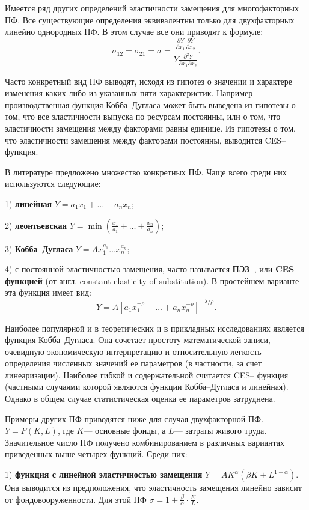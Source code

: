 \documentclass[12pt,openbib]{report}
\begin{document}
Имеется ряд других определений эластичности замещения для
многофакторных ПФ. Все существующие определения эквивалентны только
для двухфакторных линейно однородных ПФ. В этом случае все они
приводят к формуле:
$$\sigma_{12}=\sigma_{21}=\sigma=\frac{\frac{\partial Y}{\partial
x_1}\frac{\partial Y}{\partial x_2}}{Y\frac{\partial^2 Y}{\partial
x_1\partial x_2}}.$$

Часто конкретный вид ПФ выводят, исходя из гипотез о значении и
характере изменения каких-либо из указанных пяти характеристик.
Например производственная функция Кобба--Дугласа может быть выведена
из гипотезы о том, что все эластичности выпуска по ресурсам
постоянны, или о том, что эластичности замещения между факторами
равны единице. Из гипотезы о том, что эластичности замещения между
факторами постоянны, выводится CES--функция.

В литературе предложено множество конкретных ПФ. Чаще всего среди
них используются следующие:

1) {\bf линейная} $Y=a_1x_1+\dots+a_nx_n$;

2) {\bf леонтьевская}
$Y=\min\left(\frac{x_1}{a_1}+\dots+\frac{x_n}{a_n}\right)$;

3) {\bf Кобба--Дугласа} $Y=Ax_1^{a_1}\dots x_n^{a_n}$;

4) с постоянной эластичностью замещения, часто называется {\bf
ПЭЗ--}, или {\bf CES-- функцией} (от англ. constant elasticity of
substitution). В простейшем варианте эта функция имеет вид:
$$Y=A[a_1x_1^{-\rho}+\dots+a_nx_n^{-\rho}]^{-\lambda/\rho}.$$

Наиболее популярной и в теоретических и в прикладных исследованиях
является функция Кобба--Дугласа. Она сочетает простоту
математической записи, очевидную экономическую интерпретацию и
относительную легкость определения численных значений ее параметров
(в частности, за счет линеаризации). Наиболее гибкой и
содержательной считается CES-- функция (частными случаями которой
являются функции Кобба--Дугласа и линейная). Однако в общем случае
статистическая оценка ее параметров затруднена.

Примеры других ПФ приводятся ниже для случая двухфакторной ПФ.
$Y=F(K,L)$, где $K$--- основные фонды, а $L$--- затраты живого
труда. Значительное число ПФ получено комбинированием в различных
вариантах приведенных выше четырех функций. Среди них:

1) {\bf функция с линейной эластичностью замещения}
$Y=AK^\alpha(\beta K+L^{1-\alpha})$. Она выводится из предположения,
что эластичность замещения линейно зависит от фондовооруженности.
Для этой ПФ $\sigma=1+\frac\beta\alpha\cdot\frac KL$.
\end{document}
